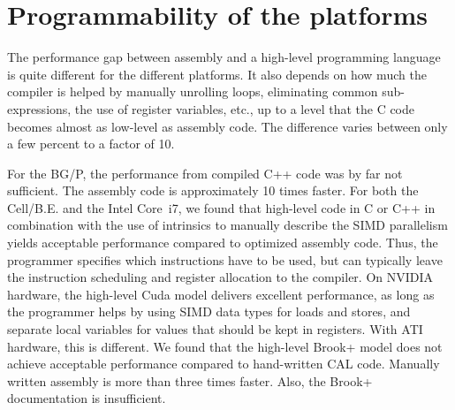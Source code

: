 \documentclass{article}
\begin{document}


\section{Programmability of the platforms}

The performance gap between assembly and a high-level programming language 
is quite different for the different platforms. It also
depends on how much the compiler is helped by manually unrolling
loops, eliminating common sub-expressions, the use of register variables,
etc., up to a level that the C code becomes almost as low-level as assembly
code. The difference varies between only a few percent to a factor of 10. 

For the BG/P, the performance from compiled C++ code was by far not
sufficient. The assembly code is approximately 10 times faster.
For both the \mbox{Cell/B.E.} and the Intel Core~i7, we found that
high-level code in C or C++ in combination with the use of intrinsics
to manually describe the SIMD parallelism yields acceptable
performance compared to optimized assembly code.  Thus, the programmer
specifies which instructions have to be used, but can typically leave
the instruction scheduling and register allocation to the compiler.
On NVIDIA hardware, the high-level Cuda model delivers excellent
performance, as long as the programmer helps by using SIMD data types
for loads and stores, and separate local variables for values that
should be kept in registers. With ATI hardware, this is different.  We
found that the high-level Brook+ model does not achieve acceptable
performance compared to hand-written CAL code.  Manually written assembly 
is more than three times faster. Also, the Brook+ documentation is insufficient.
\end{document}
